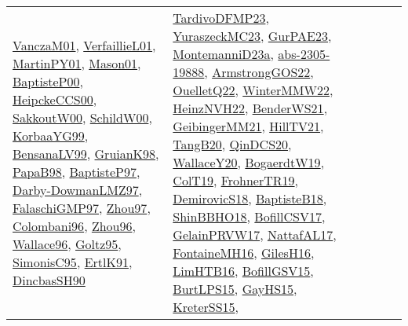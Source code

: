 {\begin{longtable}{lp{3cm}>{\raggedright}p{6cm}>{\raggedright}p{6cm}p{8cm}}
\href{papers/VanczaM01.pdf}{VanczaM01}\cite{VanczaM01}, \href{papers/VerfaillieL01.pdf}{VerfaillieL01}\cite{VerfaillieL01}, \href{articles/MartinPY01.pdf}{MartinPY01}\cite{MartinPY01}, \href{articles/Mason01.pdf}{Mason01}\cite{Mason01}, \href{articles/BaptisteP00.pdf}{BaptisteP00}\cite{BaptisteP00}, \href{articles/HeipckeCCS00.pdf}{HeipckeCCS00}\cite{HeipckeCCS00}, \href{articles/SakkoutW00.pdf}{SakkoutW00}\cite{SakkoutW00}, \href{articles/SchildW00.pdf}{SchildW00}\cite{SchildW00}, \href{papers/KorbaaYG99.pdf}{KorbaaYG99}\cite{KorbaaYG99}, \href{articles/BensanaLV99.pdf}{BensanaLV99}\cite{BensanaLV99}, \href{papers/GruianK98.pdf}{GruianK98}\cite{GruianK98}, \href{articles/PapaB98.pdf}{PapaB98}\cite{PapaB98}, \href{papers/BaptisteP97.pdf}{BaptisteP97}\cite{BaptisteP97}, \href{articles/Darby-DowmanLMZ97.pdf}{Darby-DowmanLMZ97}\cite{Darby-DowmanLMZ97}, \href{articles/FalaschiGMP97.pdf}{FalaschiGMP97}\cite{FalaschiGMP97}, \href{articles/Zhou97.pdf}{Zhou97}\cite{Zhou97}, \href{papers/Colombani96.pdf}{Colombani96}\cite{Colombani96}, \href{papers/Zhou96.pdf}{Zhou96}\cite{Zhou96}, \href{articles/Wallace96.pdf}{Wallace96}\cite{Wallace96}, \href{papers/Goltz95.pdf}{Goltz95}\cite{Goltz95}, \href{papers/SimonisC95.pdf}{SimonisC95}\cite{SimonisC95}, \href{papers/ErtlK91.pdf}{ErtlK91}\cite{ErtlK91}, \href{articles/DincbasSH90.pdf}{DincbasSH90}\cite{DincbasSH90} & \href{papers/TardivoDFMP23.pdf}{TardivoDFMP23}\cite{TardivoDFMP23}, \href{papers/YuraszeckMC23.pdf}{YuraszeckMC23}\cite{YuraszeckMC23}, \href{articles/GurPAE23.pdf}{GurPAE23}\cite{GurPAE23}, \href{articles/MontemanniD23a.pdf}{MontemanniD23a}\cite{MontemanniD23a}, \href{articles/abs-2305-19888.pdf}{abs-2305-19888}\cite{abs-2305-19888}, \href{papers/ArmstrongGOS22.pdf}{ArmstrongGOS22}\cite{ArmstrongGOS22}, \href{papers/OuelletQ22.pdf}{OuelletQ22}\cite{OuelletQ22}, \href{papers/WinterMMW22.pdf}{WinterMMW22}\cite{WinterMMW22}, \href{articles/HeinzNVH22.pdf}{HeinzNVH22}\cite{HeinzNVH22}, \href{papers/BenderWS21.pdf}{BenderWS21}\cite{BenderWS21}, \href{papers/GeibingerMM21.pdf}{GeibingerMM21}\cite{GeibingerMM21}, \href{papers/HillTV21.pdf}{HillTV21}\cite{HillTV21}, \href{papers/TangB20.pdf}{TangB20}\cite{TangB20}, \href{articles/QinDCS20.pdf}{QinDCS20}\cite{QinDCS20}, \href{articles/WallaceY20.pdf}{WallaceY20}\cite{WallaceY20}, \href{papers/BogaerdtW19.pdf}{BogaerdtW19}\cite{BogaerdtW19}, \href{papers/ColT19.pdf}{ColT19}\cite{ColT19}, \href{papers/FrohnerTR19.pdf}{FrohnerTR19}\cite{FrohnerTR19}, \href{papers/DemirovicS18.pdf}{DemirovicS18}\cite{DemirovicS18}, \href{articles/BaptisteB18.pdf}{BaptisteB18}\cite{BaptisteB18}, \href{articles/ShinBBHO18.pdf}{ShinBBHO18}\cite{ShinBBHO18}, \href{papers/BofillCSV17.pdf}{BofillCSV17}\cite{BofillCSV17}, \href{papers/GelainPRVW17.pdf}{GelainPRVW17}\cite{GelainPRVW17}, \href{articles/NattafAL17.pdf}{NattafAL17}\cite{NattafAL17}, \href{papers/FontaineMH16.pdf}{FontaineMH16}\cite{FontaineMH16}, \href{papers/GilesH16.pdf}{GilesH16}\cite{GilesH16}, \href{papers/LimHTB16.pdf}{LimHTB16}\cite{LimHTB16}, \href{papers/BofillGSV15.pdf}{BofillGSV15}\cite{BofillGSV15}, \href{papers/BurtLPS15.pdf}{BurtLPS15}\cite{BurtLPS15}, \href{papers/GayHS15.pdf}{GayHS15}\cite{GayHS15}, \href{papers/KreterSS15.pdf}{KreterSS15}\cite{KreterSS15}, 
\end{longtable}}
